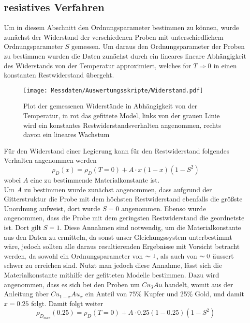 \subsection{resistives Verfahren}
    Um in diesem Abschnitt den Ordnungsparameter bestimmen zu können, wurde zunächst der Widerstand der verschiedenen Proben mit
    unterschiedlichem Ordnungsparameter $S$ gemessen. Um daraus den Ordnungsparameter der Proben zu bestimmen
    wurden die Daten zunächst durch ein lineares lineare Abhängigkeit des Widerstands von der Temperatur
    approximiert, welches for $T\Rightarrow 0$ in einen konstanten Restwiderstand übergeht.
    \begin{figure}[H]
        \centering
        \texttt{[image: Messdaten/Auswertungsskripte/Widerstand.pdf]}
        \caption{Plot der gemessenen Widerstände in Abhängigkeit von der Temperatur, in rot das gefittete Model, links von der grauen Linie wird
        ein konstantes Restwiderstandsverhalten angenommen, rechts davon ein lineares Wachstum}
        \label{resistance plot}
    \end{figure}
    Für den Widerstand einer Legierung kann für den Restwiderstand folgendes Verhalten angenommen werden
    \begin{equation}
        \rho_D(x) = \rho_D(T=0) + A\cdot x(1-x)(1-S^2)
    \end{equation}
    wobei $A$ eine zu bestimmende Materialkonstante ist.\\
    Um $A$ zu bestimmen wurde zunächst angenommen, dass aufgrund der Gitterstruktur die Probe mit dem höchsten
    Restwiderstand ebenfalls die größste Unordnung aufweist, dort wurde $S=0$ angenommen. Ebenso wurde angenommen,
    dass die Probe mit dem geringsten Restwiderstand die geordnetste ist. Dort gilt $S=1$. Diese Annahmen sind
    notwendig, um die Materialkonstante aus den Daten zu ermitteln, da sonst unser Gleichungssystem unterbestimmt wäre,
    jedoch sollten alle daraus resultierenden Ergebnisse mit Vorsicht betracht werden, da sowohl ein Ordnungsparameter
    von $\thicksim 1$, als auch von $\thicksim 0$ äussert schwer zu erreichen sind. Nutzt man jedoch diese Annahme, lässt sich die Materialkonstante
    mithilfe der gefitteten Modelle bestimmen. Dazu wird angenommen, dass es sich bei den Proben um $Cu_3Au$ handelt, womit
    aus der Anleitung über $Cu_{1-x}Au_x$ ein Anteil von 75\% Kupfer und 25\% Gold, und damit $x=0.25$ folgt. Damit folgt weiter
    \begin{equation}
        \rho_{D_{max}}(0.25) = \rho_D(T=0) + A\cdot 0.25(1-0.25)(1-S^2)
    \end{equation} 
